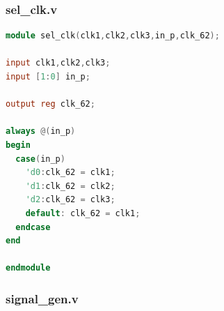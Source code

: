 \documentclass[11pt]{scrartcl}
\begin{document}
\subsubsection{sel\_clk.v}
\label{sec:selclkv}
\begin{lstlisting}[language=Verilog]
module sel_clk(clk1,clk2,clk3,in_p,clk_62);

input clk1,clk2,clk3;
input [1:0] in_p;

output reg clk_62;

always @(in_p)
begin
  case(in_p)
    'd0:clk_62 = clk1;
    'd1:clk_62 = clk2;
    'd2:clk_62 = clk3;
    default: clk_62 = clk1;
  endcase
end

endmodule
\end{lstlisting}

\subsubsection{signal\_gen.v}
\label{sec:signalgenv}
\end{document}
